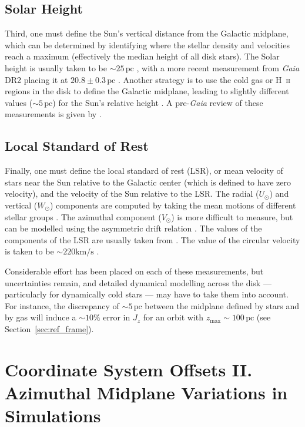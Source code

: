 \documentclass[twocolumn]{aastex62}
\newcommand{\pc}{\text{pc}}
\newcommand{\kms}{\text{km}/\text{s}}
\begin{document}
\subsection{Solar Height}
Third, one must define the Sun's vertical distance from the Galactic
midplane, which can be determined by identifying where the stellar density
and velocities reach a maximum (effectively the median height of all disk
stars). The Solar height is usually taken to be $\sim 25\,\pc$
\citep{2001ApJ...553..184C}, with a more recent measurement from {\em Gaia} DR2
placing it at $20.8 \pm 0.3\,\pc$ \citep{2019MNRAS.482.1417B}. Another strategy is
to use the cold gas or H~\textsc{ii} regions in the disk to define the Galactic
midplane, leading to slightly different values ($\sim 5\,\pc$) for the Sun's
relative height \citep[e.g.][]{2019ApJ...871..145A}. A pre-{\em Gaia} review
of these measurements is given by \citet{2016ARAA..54..529B}.

\subsection{Local Standard of Rest}
Finally, one must define the local standard of rest (LSR), or mean velocity of stars near the Sun relative to the Galactic center (which is defined to have zero velocity), and the velocity of the Sun relative to the LSR. The radial
($U_{\odot}$) and vertical ($W_{\odot}$) components are computed by
taking the mean motions of different stellar groups \citep[e.g.][]{2012MNRAS.427..274S}. The azimuthal component
($V_{\odot}$) is more difficult to measure, but can be modelled using the
asymmetric drift relation \citep{2008gady.book.....B}. The values of the
components of the LSR are usually taken from \citet{2010MNRAS.403.1829S}. The
value of the circular velocity is taken to be $\sim 220\kms$
\citep[e.g.][]{2012ApJ...759..131B}.

\vspace{6pt}

Considerable effort has been placed on each of these
measurements, but uncertainties remain, and detailed dynamical modelling
across the disk --- particularly for dynamically cold stars --- may have to
take them into account. For instance, the discrepancy of $\sim 5\,\pc$ between
the midplane defined by stars and by gas will induce a $\sim10\%$ error in
$J_z$ for an orbit with $z_{\text{max}}\sim100\,\pc$ (see
Section~\ref{sec:ref_frame}).

\section{Coordinate System Offsets II. Azimuthal Midplane Variations in
Simulations}
\label{sec:local_fire}
\end{document}
